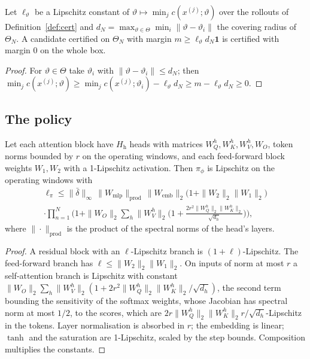 \begin{lemma}\label{lem:cover}
Let $\ell_\vartheta$ be a Lipschitz constant of $\vartheta\mapsto\min_jc(x^{(j)};\vartheta)$ over the rollouts of Definition~\ref{def:cert} and $d_N=\max_{\vartheta\in\Theta}\min_i\|\vartheta-\vartheta_i\|$ the covering radius of $\Theta_N$. A candidate certified on $\Theta_N$ with margin $m\ge\ell_\vartheta d_N\mathbf 1$ is certified with margin $0$ on the whole box.
\end{lemma}
\begin{proof}
For $\vartheta\in\Theta$ take $\vartheta_i$ with $\|\vartheta-\vartheta_i\|\le d_N$; then $\min_jc(x^{(j)};\vartheta)\ge\min_jc(x^{(j)};\vartheta_i)-\ell_\vartheta d_N\ge m-\ell_\vartheta d_N\ge0$.
\end{proof}

\subsection{The policy}
\begin{lemma}\label{lem:lip}
Let each attention block have $H_{\mathrm h}$ heads with matrices $W_Q^h,W_K^h,W_V^h,W_O$, token norms bounded by $r$ on the operating windows, and each feed-forward block weights $W_1,W_2$ with a 1-Lipschitz activation. Then $\pi_\phi$ is Lipschitz on the operating windows with
\begin{equation}\label{eq:lip}
\begin{aligned}\ell_\pi\le\|\bar\delta\|_\infty\,\|W_{\mathrm{mlp}}\|_{\mathrm{prod}}\,\|W_{\mathrm{emb}}\|_2\big(1+\|W_2\|_2\|W_1\|_2\big)\\ \cdot\prod_{n=1}^{N}\Big(1+\|W_O\|_2\sum_h\|W_V^h\|_2\big(1+\tfrac{2r^2\|W_Q^h\|_2\|W_K^h\|_2}{\sqrt{d_h}}\big)\Big),\end{aligned}
\end{equation}
where $\|\cdot\|_{\mathrm{prod}}$ is the product of the spectral norms of the head's layers.
\end{lemma}
\begin{proof}
A residual block with an $\ell$-Lipschitz branch is $(1+\ell)$-Lipschitz. The feed-forward branch has $\ell\le\|W_2\|_2\|W_1\|_2$. On inputs of norm at most $r$ a self-attention branch is Lipschitz with constant $\|W_O\|_2\sum_h\|W_V^h\|_2(1+2r^2\|W_Q^h\|_2\|W_K^h\|_2/\sqrt{d_h})$, the second term bounding the sensitivity of the softmax weights, whose Jacobian has spectral norm at most $1/2$, to the scores, which are $2r\|W_Q^h\|_2\|W_K^h\|_2r/\sqrt{d_h}$-Lipschitz in the tokens. Layer normalisation is absorbed in $r$; the embedding is linear; $\tanh$ and the saturation are 1-Lipschitz, scaled by the step bounds. Composition multiplies the constants.
\end{proof}

